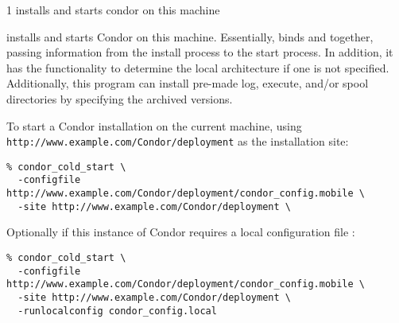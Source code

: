 \begin{ManPage}{\label{man-condor-cold-start}}{1}
{installs and starts condor on this machine}

\Synopsis {}


\Description

 installs and starts Condor on this machine.
Essentially,  binds  and
 together, passing information from the install
process to the start process.  In addition, it has the functionality
to determine the local architecture if one is not specified.
Additionally, this program can install pre-made log, execute, and/or
spool directories by specifying the archived versions.

\Examples

To start a Condor installation on the current machine, using
\texttt{http://www.example.com/Condor/deployment} as the installation
site: 
\begin{verbatim}
% condor_cold_start \
  -configfile http://www.example.com/Condor/deployment/condor_config.mobile \
  -site http://www.example.com/Condor/deployment \
\end{verbatim}

Optionally if this instance of Condor requires a local configuration
file :
\begin{verbatim}
% condor_cold_start \
  -configfile http://www.example.com/Condor/deployment/condor_config.mobile \
  -site http://www.example.com/Condor/deployment \
  -runlocalconfig condor_config.local
\end{verbatim}
  

\end{ManPage}
